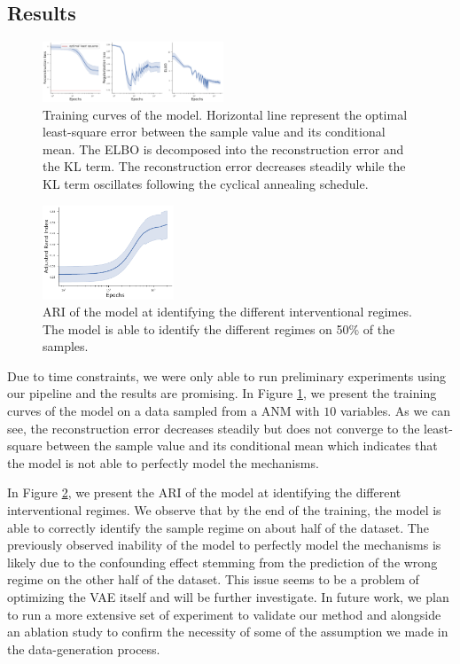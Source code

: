 \documentclass{article}
\begin{document}
\subsection{Results}

\begin{figure}
    \centering
    \includegraphics[width=0.48\textwidth]{images/results.pdf}
    \caption{Training curves of the model. Horizontal line represent the optimal least-square error between the sample value and its conditional mean. The ELBO is decomposed into the reconstruction error and the KL term. The reconstruction error decreases steadily while the KL term oscillates following the cyclical annealing schedule. }
    \label{fig:losses}
\end{figure}

\begin{figure}
    \centering
    \includegraphics[width=0.35\textwidth]{images/ARI.pdf}
    \caption{ARI of the model at identifying the different interventional regimes. The model is able to identify the different regimes on 50\% of the samples.}
    \label{fig:ARI}
\end{figure}

Due to time constraints, we were only able to run preliminary experiments using
our pipeline and the results are promising. In Figure \ref{fig:losses}, we
present the training curves of the model on a data sampled from a ANM with $10$
variables. As we can see, the reconstruction error decreases steadily but does
not converge to the least-square between the sample value and its conditional
mean which indicates that the model is not able to perfectly model the
mechanisms.

In Figure \ref{fig:ARI}, we present the ARI of the model at identifying the
different interventional regimes. We observe that by the end of the training,
the model is able to correctly identify the sample regime on about half of the
dataset. The previously observed inability of the model to perfectly model the
mechanisms is likely due to the confounding effect stemming from the prediction
of the wrong regime on the other half of the dataset. This issue seems to be a
problem of optimizing the VAE itself and will be further investigate. In future
work, we plan to run a more extensive set of experiment to validate our method
and alongside an ablation study to confirm the necessity of some of the
assumption we made in the data-generation process.
\end{document}
